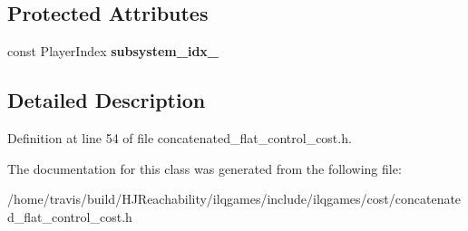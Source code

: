 \subsection*{Protected Attributes}
\begin{DoxyCompactItemize}
\item 
const Player\+Index {\bfseries subsystem\+\_\+idx\+\_\+}\hypertarget{classilqgames_1_1_concatenated_flat_control_cost_a9d1903c5ca6f278b7e8ed1f6ed93775b}{}\label{classilqgames_1_1_concatenated_flat_control_cost_a9d1903c5ca6f278b7e8ed1f6ed93775b}

\end{DoxyCompactItemize}


\subsection{Detailed Description}


Definition at line 54 of file concatenated\+\_\+flat\+\_\+control\+\_\+cost.\+h.



The documentation for this class was generated from the following file\+:\begin{DoxyCompactItemize}
\item 
/home/travis/build/\+H\+J\+Reachability/ilqgames/include/ilqgames/cost/concatenated\+\_\+flat\+\_\+control\+\_\+cost.\+h\end{DoxyCompactItemize}
